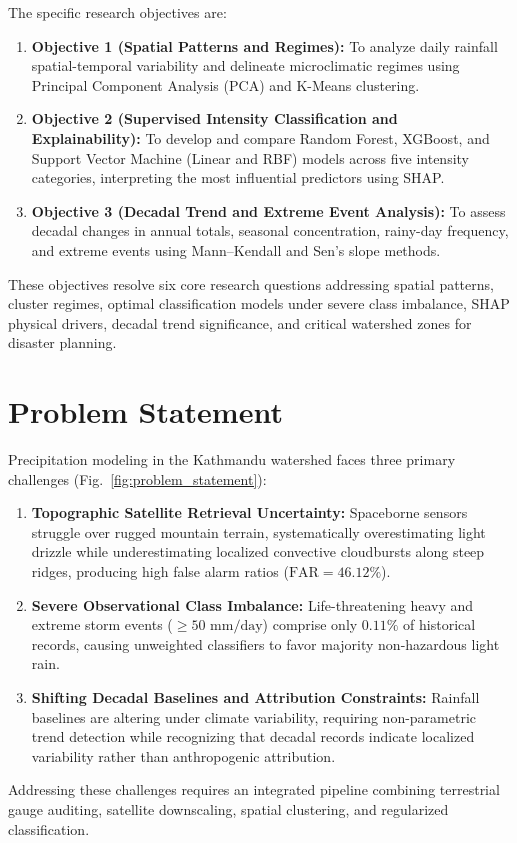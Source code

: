 \documentclass[conference]{IEEEtran}
\begin{document}
The specific research objectives are:
\begin{enumerate}
    \item \textbf{Objective 1 (Spatial Patterns and Regimes):} To analyze daily rainfall spatial-temporal variability and delineate microclimatic regimes using Principal Component Analysis (PCA) and K-Means clustering.
    \item \textbf{Objective 2 (Supervised Intensity Classification and Explainability):} To develop and compare Random Forest, XGBoost, and Support Vector Machine (Linear and RBF) models across five intensity categories, interpreting the most influential predictors using SHAP.
    \item \textbf{Objective 3 (Decadal Trend and Extreme Event Analysis):} To assess decadal changes in annual totals, seasonal concentration, rainy-day frequency, and extreme events using Mann--Kendall and Sen's slope methods.
\end{enumerate}

These objectives resolve six core research questions addressing spatial patterns, cluster regimes, optimal classification models under severe class imbalance, SHAP physical drivers, decadal trend significance, and critical watershed zones for disaster planning.


\section{Problem Statement}
\label{sec:problem_statement}
Precipitation modeling in the Kathmandu watershed faces three primary challenges (Fig.~\ref{fig:problem_statement}):
\begin{enumerate}
    \item \textbf{Topographic Satellite Retrieval Uncertainty:} Spaceborne sensors struggle over rugged mountain terrain, systematically overestimating light drizzle while underestimating localized convective cloudbursts along steep ridges, producing high false alarm ratios ($\text{FAR} = 46.12\%$).
    \item \textbf{Severe Observational Class Imbalance:} Life-threatening heavy and extreme storm events ($\ge 50\text{ mm/day}$) comprise only $0.11\%$ of historical records, causing unweighted classifiers to favor majority non-hazardous light rain.
    \item \textbf{Shifting Decadal Baselines and Attribution Constraints:} Rainfall baselines are altering under climate variability, requiring non-parametric trend detection while recognizing that decadal records indicate localized variability rather than anthropogenic attribution.
\end{enumerate}
Addressing these challenges requires an integrated pipeline combining terrestrial gauge auditing, satellite downscaling, spatial clustering, and regularized classification.
\end{document}
